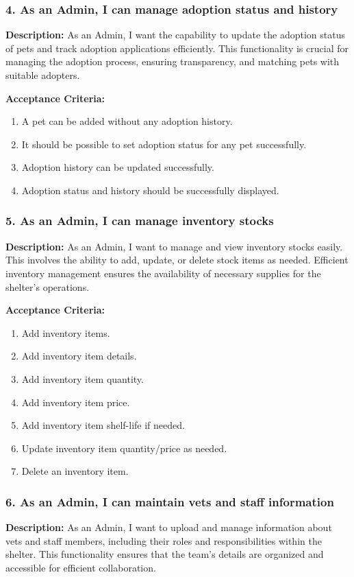 \subsubsection*{4. As an Admin, I can manage adoption status and history}
\textbf{Description:} As an Admin, I want the capability to update the adoption status of pets and track adoption applications efficiently. This functionality is crucial for managing the adoption process, ensuring transparency, and matching pets with suitable adopters.

\textbf{Acceptance Criteria:}
\begin{enumerate}
    \item A pet can be added without any adoption history.
    \item It should be possible to set adoption status for any pet successfully.
    \item Adoption history can be updated successfully.
    \item Adoption status and history should be successfully displayed.
\end{enumerate}

\subsubsection*{5. As an Admin, I can manage inventory stocks}
\textbf{Description:} As an Admin, I want to manage and view inventory stocks easily. This involves the ability to add, update, or delete stock items as needed. Efficient inventory management ensures the availability of necessary supplies for the shelter's operations.

\textbf{Acceptance Criteria:}
\begin{enumerate}
    \item Add inventory items.
    \item Add inventory item details.
    \item Add inventory item quantity.
    \item Add inventory item price.
    \item Add inventory item shelf-life if needed.
    \item Update inventory item quantity/price as needed.
    \item Delete an inventory item.
\end{enumerate}


\subsubsection*{6. As an Admin, I can maintain vets and staff information}
\textbf{Description:} As an Admin, I want to upload and manage information about vets and staff members, including their roles and responsibilities within the shelter. This functionality ensures that the team's details are organized and accessible for efficient collaboration.


